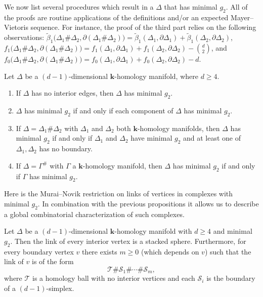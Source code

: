 \documentclass[ALCO,ThmDefs,Unicode,epreuves]{cedram}
\newcommand{\field}{\mathbf{k}}
\newcommand{\T}{{\mathcal T}}
\newcommand{\Sm}{{\mathcal S}}
\begin{document}
We now list several procedures which result in a $\Delta$ that has minimal $g_2.$ 
All of the proofs are routine applications of the definitions and/or an expected Mayer--Vietoris sequence. For instance, the proof of the third part relies on the following observations: $\tilde{\beta}_1\big(\Delta_1\#\Delta_2, \partial(\Delta_1\#\Delta_2)\big)=\tilde{\beta}_1(\Delta_1,\partial\Delta_1)+\tilde{\beta}_1(\Delta_2, \partial\Delta_2)$, $f_1\big(\Delta_1\#\Delta_2, \partial(\Delta_1\#\Delta_2)\big)=f_1(\Delta_1,\partial\Delta_1)+f_1(\Delta_2, \partial\Delta_2)-\binom{d}{2}$, and $f_0\big(\Delta_1\#\Delta_2, \partial(\Delta_1\#\Delta_2)\big)=f_0(\Delta_1,\partial\Delta_1)+f_0(\Delta_2, \partial\Delta_2)-d$.
\begin{prop} \label{minimal g2 properties}
 Let $\Delta$ be a $(d-1)$-dimensional $\field$-homology manifold, where $d\geq 4$. 
 \begin{enumerate}
 \item\label{prop7.9_1} 
 If $\Delta$ has no interior edges, then $\Delta$ has minimal $g_2.$ 
 \item\label{prop7.9_2} \label{components}
 $\Delta$ has minimal $g_2$ if and only if each component of $\Delta$ has minimal $g_2.$ 
 \item\label{prop7.9_3} 
 If $\Delta = \Delta_1 \# \Delta_2$ with $\Delta_1$ and $\Delta_2$ both $\field$-homology manifolds, then $\Delta$ has minimal $g_2$ if and only if $\Delta_1$ and $\Delta_2$ have minimal $g_2$ and at least one of $\Delta_1, \Delta_2$ has no boundary. 
 \item\label{prop7.9_4}
 If $\Delta = \Gamma^\#$ with $\Gamma$ a $\field$-homology manifold, then $\Delta$ has minimal $g_2$ if and only if $\Gamma$ has minimal $g_2.$
 \end{enumerate}
\end{prop}

Here is the Murai--Novik restriction on links of vertices in complexes with minimal $g_2.$ In combination with the previous propositions it allows us to describe a global combinatorial characterization of such complexes. 
\begin{theorem}\label{local minimal g2}
 Let $\Delta$ be a $(d-1)$-dimensional $\field$-homology manifold with $d \ge 4$ and minimal $g_2.$ Then the link of every interior vertex is a stacked sphere. Furthermore, for every boundary vertex $v$ there exists $m \ge 0$ (which depends on $v$) such that the link of $v$ is of the form 
 \[
 \T \# \Sm_1 \# \cdots \# \Sm_m,
 \]
 where $\T$ is a homology ball with no interior vertices and each $\Sm_i$ is the boundary of a $(d-1)$-simplex. 
\end{theorem}
\end{document}
